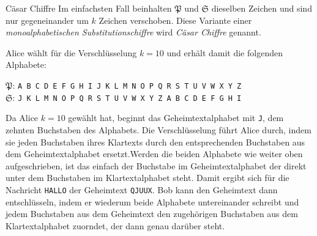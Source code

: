 \documentclass[german]{spicker}
\begin{document}
\begin{example}{Cäsar Chiffre}
    Im einfachsten Fall beinhalten $\mathfrak{P}$ und $\mathfrak{S}$ dieselben Zeichen und sind nur gegeneinander
    um $k$ Zeichen verschoben. Diese Variante einer \emph{monoalphabetischen Substitutionschiffre} wird \emph{Cäsar Chiffre} genannt.

    Alice wählt für die Verschlüsselung $k = 10$ und erhält damit die folgenden Alphabete:

    \begin{center}
        $\mathfrak{P}$: \texttt{A B C D E F G H I J K L M N O P Q R S T U V W X Y Z}\\
        $\mathfrak{S}$: \texttt{J K L M N O P Q R S T U V W X Y Z A B C D E F G H I}\\
    \end{center}

    Da Alice $k = 10$ gewählt hat, beginnt das Geheimtextalphabet mit \texttt{J}, dem
    zehnten Buchstaben des Alphabets. Die Verschlüsselung führt Alice durch,
    indem sie jeden Buchstaben ihres Klartexts durch den entsprechenden Buchstaben
    aus dem Geheimtextalphabet ersetzt.Werden die beiden Alphabete wie
    weiter oben aufgeschrieben, ist das einfach der Buchstabe im Geheimtextalphabet
    der direkt unter dem Buchstaben im Klartextalphabet steht. Damit ergibt
    sich für die Nachricht \texttt{HALLO} der Geheimtext \texttt{QJUUX}. Bob kann den
    Geheimtext dann entschlüsseln, indem er wiederum beide Alphabete untereinander
    schreibt und jedem Buchstaben aus dem Geheimtext den zugehörigen
    Buchstaben aus dem Klartextalphabet zuorndet, der dann genau darüber steht.
\end{example}
\end{document}
